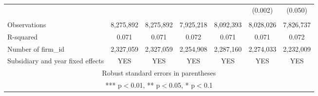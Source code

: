 \begin{tabular}{lcccccc}
 &  &  &  &  & (0.002) & (0.050) \\
 &  &  &  &  &  &  \\
Observations & 8,275,892 & 8,275,892 & 7,925,218 & 8,092,393 & 8,028,026 & 7,826,737 \\
R-squared & 0.071 & 0.071 & 0.072 & 0.071 & 0.071 & 0.072 \\
Number of firm\_id & 2,327,059 & 2,327,059 & 2,254,908 & 2,287,160 & 2,274,033 & 2,232,009 \\
 Subsidiary and year fixed effects & YES & YES & YES & YES & YES & YES \\ \hline
\multicolumn{7}{c}{ Robust standard errors in parentheses} \\
\multicolumn{7}{c}{ *** p$<$0.01, ** p$<$0.05, * p$<$0.1} \\
\end{tabular}
